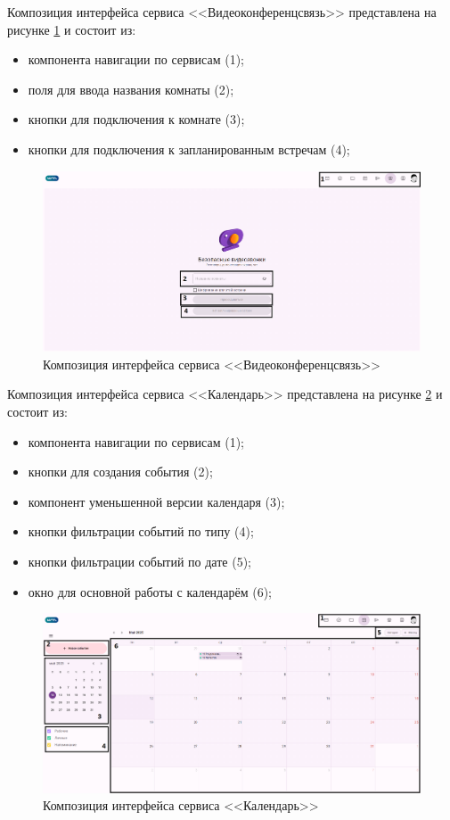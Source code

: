 Композиция интерфейса сервиса <<Видеоконференцсвязь>> представлена на рисунке \ref{templ:image2} и состоит из:
\begin{itemize}
  \item компонента навигации по сервисам (1);
  \item поля для ввода названия комнаты (2);
  \item кнопки для подключения к комнате (3);
  \item кнопки для подключения к запланированным встречам (4);
\end{itemize}
\begin{figure}[H]
	\centering
	\includegraphics[width=1\linewidth]{images/вкс}
	\caption{Композиция интерфейса сервиса <<Видеоконференцсвязь>>}
	\label{templ:image2}
\end{figure}

Композиция интерфейса сервиса <<Календарь>> представлена на рисунке \ref{templ:image3} и состоит из:
\begin{itemize}
  \item компонента навигации по сервисам (1);
  \item кнопки для создания события (2);
  \item компонент уменьшенной версии календаря (3);
  \item кнопки фильтрации событий по типу (4);
  \item кнопки фильтрации событий по дате (5);
  \item окно для основной работы с календарём (6);
\end{itemize}
\begin{figure}[H]
	\centering
	\includegraphics[width=1\linewidth]{images/календарь}
	\caption{Композиция интерфейса сервиса <<Календарь>>}
	\label{templ:image3}
\end{figure}

